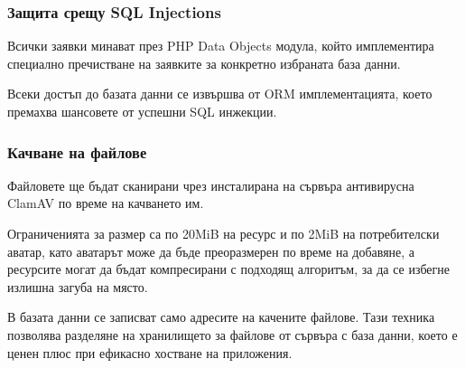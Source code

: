 \subsubsection{Защита срещу SQL Injections}

Всички заявки минават през PHP Data Objects модула,
който имплементира специално пречистване на заявките за
конкретно избраната база данни.

Всеки достъп до базата данни се извършва от ORM
имплементацията, което премахва шансовете от успешни
SQL инжекции.

\subsubsection{Качване на файлове}

Файловете ще бъдат сканирани чрез инсталирана на сървъра
антивирусна ClamAV по време на качването им.

Ограниченията за размер са по 20MiB на ресурс и по 2MiB
на потребителски аватар, като аватарът може да бъде
преоразмерен по време на добавяне, а ресурсите могат да
бъдат компресирани с подходящ алгоритъм, за да се избегне
излишна загуба на място.

В базата данни се записват само адресите на качените
файлове. Тази техника позволява разделяне на хранилището
за файлове от сървъра с база данни, което е ценен плюс
при ефикасно хостване на приложения.

